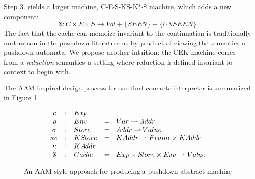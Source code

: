 \documentclass[10pt,letter,english]{article}
\newcommand{\partto}{\rightharpoonup}
\newcommand{\cek}[3]{\langle #1, #2, #3 \rangle}
\newcommand{\cesk}[4]{\langle #1, #2, #3, #4 \rangle}
\newcommand{\cessk}[5]{\langle #1, #2, #3, #4, #5 \rangle}
\newcommand{\cesskc}[6]{\langle #1, #2, #3, #4, #5, #6 \rangle}
\begin{document}
Step 3. yields a larger machine, C-E-S-KS-K*-\$ machine, which adds a new component:
\begin{equation*}
\$ : C \times E \times S \rightarrow Val + \{SEEN\} + \{UNSEEN\}
\end{equation*}
%
The fact that the cache can memoize invariant to the continuation is
traditionally understoon in the pushdown literature as by-product of viewing
the semantics a pushdown automata.
%
We propose another intuition: the CEK machine comes from a \emph{reduction}
semantics--a setting where reduction is defined invariant to context to begin
with.

The AAM-inspired design process for our final concrete interpreter is
summarized in Figure 1.

\begin{figure}
\centering

\begin{equation*}
\begin{array}{c c l c l}
  c            &:& Exp        && \\
  \rho         &:& Env        &=& Var   \partto Addr \\
  \sigma       &:& Store      &=& Addr  \partto Value \\
  \kappa\sigma &:& KStore     &=& KAddr \partto Frame \times KAddr \\
  \kappa       &:& KAddr      && \\
  \$         &:& Cache      &=& Exp \times Store \times Env \partto Value
\end{array}
\end{equation*}


\caption{An AAM-style approach for producing a pushdown abstract machine} \label{fig:M1}
\end{figure}
\end{document}
